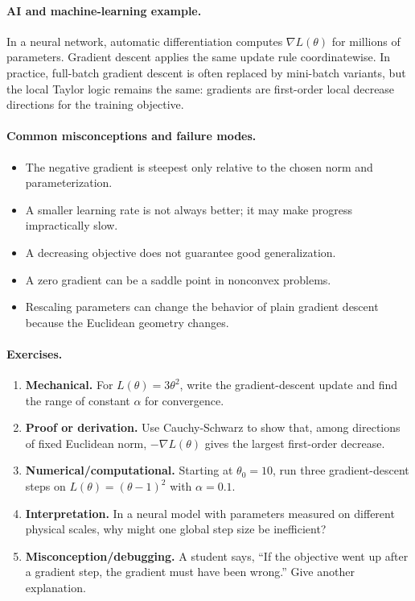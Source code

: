 \paragraph{AI and machine-learning example.}
In a neural network, automatic differentiation computes \(\nabla L(\theta)\) for millions of parameters. Gradient descent applies the same update rule coordinatewise. In practice, full-batch gradient descent is often replaced by mini-batch variants, but the local Taylor logic remains the same: gradients are first-order local decrease directions for the training objective.

\paragraph{Common misconceptions and failure modes.}
\begin{itemize}[leftmargin=*]
\item The negative gradient is steepest only relative to the chosen norm and parameterization.
\item A smaller learning rate is not always better; it may make progress impractically slow.
\item A decreasing objective does not guarantee good generalization.
\item A zero gradient can be a saddle point in nonconvex problems.
\item Rescaling parameters can change the behavior of plain gradient descent because the Euclidean geometry changes.
\end{itemize}

\paragraph{Exercises.}
\begin{enumerate}[label=\textbf{21.1.\arabic*.}, leftmargin=*]
\item \textbf{Mechanical.} For \(L(\theta)=3\theta^2\), write the gradient-descent update and find the range of constant \(\alpha\) for convergence.
\item \textbf{Proof or derivation.} Use Cauchy-Schwarz to show that, among directions of fixed Euclidean norm, \(-\nabla L(\theta)\) gives the largest first-order decrease.
\item \textbf{Numerical/computational.} Starting at \(\theta_0=10\), run three gradient-descent steps on \(L(\theta)=(\theta-1)^2\) with \(\alpha=0.1\).
\item \textbf{Interpretation.} In a neural model with parameters measured on different physical scales, why might one global step size be inefficient?
\item \textbf{Misconception/debugging.} A student says, ``If the objective went up after a gradient step, the gradient must have been wrong.'' Give another explanation.
\end{enumerate}

